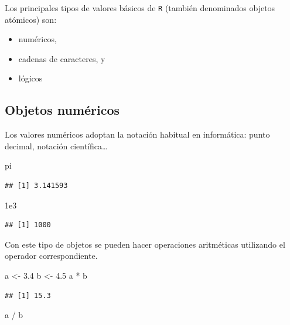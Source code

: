 \documentclass[
]{book}
\newenvironment{Shaded}{\begin{snugshade}}{\end{snugshade}}
\newcommand{\FloatTok}[1]{\textcolor[rgb]{0.00,0.00,0.81}{#1}}
\newcommand{\NormalTok}[1]{#1}
\newcommand{\OtherTok}[1]{\textcolor[rgb]{0.56,0.35,0.01}{#1}}
\newcommand{\SpecialCharTok}[1]{\textcolor[rgb]{0.00,0.00,0.00}{#1}}
\theoremstyle{break}
\theoremstyle{nonumberplain}
\begin{document}
Los principales tipos de valores básicos de \texttt{R} (también denominados objetos atómicos) son:

\begin{itemize}
\item
  numéricos,
\item
  cadenas de caracteres, y
\item
  lógicos
\end{itemize}

\hypertarget{objetos-numuxe9ricos}{%
\subsection{Objetos numéricos}\label{objetos-numuxe9ricos}}

Los valores numéricos adoptan la notación habitual en informática: punto decimal, notación científica\ldots{}

\begin{Shaded}
\begin{Highlighting}[]
\NormalTok{pi}
\end{Highlighting}
\end{Shaded}

\begin{verbatim}
## [1] 3.141593
\end{verbatim}

\begin{Shaded}
\begin{Highlighting}[]
\FloatTok{1e3}
\end{Highlighting}
\end{Shaded}

\begin{verbatim}
## [1] 1000
\end{verbatim}

Con este tipo de objetos se pueden hacer operaciones aritméticas utilizando el operador correspondiente.

\begin{Shaded}
\begin{Highlighting}[]
\NormalTok{a }\OtherTok{\textless{}{-}} \FloatTok{3.4}
\NormalTok{b }\OtherTok{\textless{}{-}} \FloatTok{4.5}
\NormalTok{a }\SpecialCharTok{*}\NormalTok{ b}
\end{Highlighting}
\end{Shaded}

\begin{verbatim}
## [1] 15.3
\end{verbatim}

\begin{Shaded}
\begin{Highlighting}[]
\NormalTok{a }\SpecialCharTok{/}\NormalTok{ b}
\end{Highlighting}
\end{Shaded}
\end{document}
